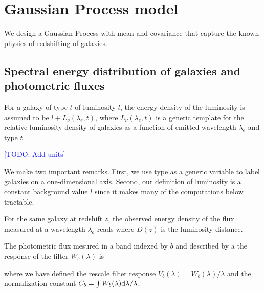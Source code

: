 \documentclass[aps,prd,showpacs,superscriptaddress,groupedaddress]{revtex4}  %
\newcommand{\todo}[1]{\textcolor{blue}{[TODO: #1]}}
\begin{document}
\section{Gaussian Process model}

We design a Gaussian Process with mean and covariance that capture the known physics of redshifting of galaxies.

\subsection{Spectral energy distribution of galaxies and photometric fluxes}

For a galaxy of type $t$ of luminosity $l$, the energy density of the luminosity is assumed to be $l + L_\nu(\lambda_e,t)$, where $L_\nu(\lambda_e,t)$ is a generic template for the relative luminosity density of galaxies as a function of emitted wavelength $\lambda_e$ and type $t$.

\todo{Add units}

We make two important remarks.
First, we use type as a generic variable to label galaxies on a one-dimensional axis. 
Second, our definition of luminosity is a constant background value $l$ since it makes many of the computations below tractable.

For the same galaxy at redshift $z$, the observed energy density of the flux measured at a wavelength $\lambda_o$ reads
where $D(z)$ is the luminosity distance.

The photometric flux mesured in a band indexed by $b$ and described by a the response of the filter $W_b(\lambda)$ is

where we have defined the rescale filter response $V_b(\lambda) = W_b(\lambda)/\lambda$ and the normalization constant $C_b = \int W_b(\lambda) \mathrm{d}\lambda / \lambda$.
\end{document}
